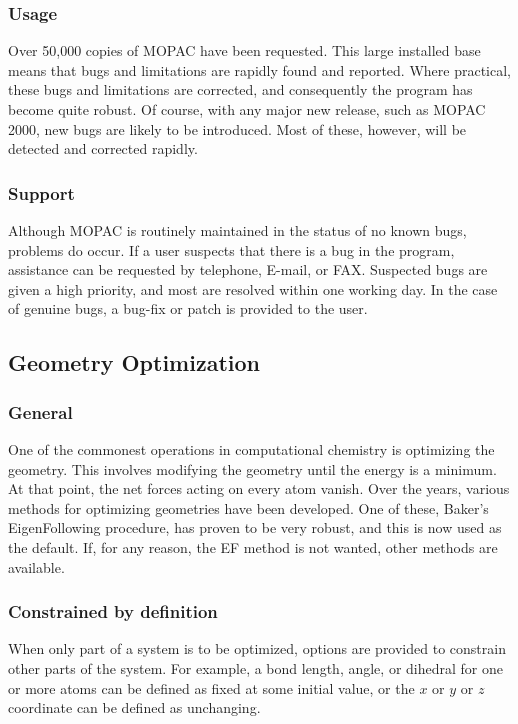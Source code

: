 \subsubsection*{Usage}

Over 50,000 copies of MOPAC have been requested.  This large installed base
means that bugs and limitations are rapidly found and reported.  Where
practical, these bugs and limitations are corrected, and consequently the
program  has become quite robust.  Of course, with any major new release, such
as  MOPAC 2000, new bugs are likely to be introduced.  Most of these, however,
will be detected and corrected rapidly.

\subsubsection*{Support}

Although MOPAC is routinely maintained in the status of no known bugs,
problems do occur.  If a user suspects that there is a bug in the program,
assistance can be requested by telephone, E-mail, or FAX.  Suspected bugs are
given a high priority, and most are resolved within one working day.  In the
case  of genuine bugs, a bug-fix or patch is provided to the user.

\subsection{Geometry Optimization}

\subsubsection*{General}

One of the commonest operations in computational chemistry is optimizing the
geometry.  This involves modifying the geometry until the energy is a
minimum.   At that point, the net forces acting on every atom vanish.  Over the
years,  various methods for optimizing geometries have been developed.  One of
these,  Baker's EigenFollowing procedure, has proven to be very robust, and
this is  now used as the default.  If, for any reason, the EF method is not
wanted, other  methods are available.

\subsubsection*{Constrained by definition}

When only part of a system is to be optimized, options are provided to
constrain  other parts of the system.  For example, a bond length, angle, or
dihedral for one  or more atoms can be defined as fixed at some initial value,
or the $x$ or $y$  or $z$ coordinate can be defined as unchanging.


